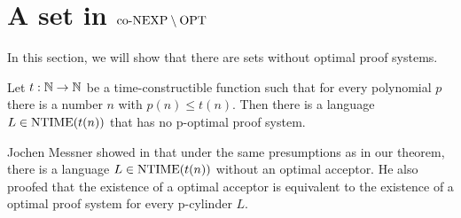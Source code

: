 \chapter{A set in $\text{co-NEXP} \setminus \text{OPT}$}
  In this section, we will show that there are sets without optimal proof systems.
  
  \begin{theorem}
    Let \(t : \mathbb{N} \to \mathbb{N}\) be a time-constructible function such that for every polynomial \(p\) there is a number \(n\) with \(p(n) \leq t(n)\). Then there is a language \(L \in \text{NTIME}(t(n))\) that has no p-optimal proof system.
  \end{theorem}

  Jochen Messner showed in \cite{Mes99} that under the same presumptions as in our theorem, there is a language \(L \in \text{NTIME}(t(n))\) without an optimal acceptor. He also proofed that the existence of a optimal acceptor is equivalent to the existence of a optimal proof system for every p-cylinder \(L\).
  

